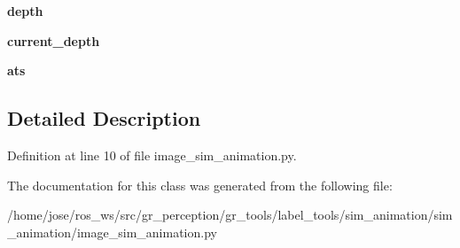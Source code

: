\begin{DoxyCompactItemize}
{\bfseries depth}
\item 
\mbox{\label{classsim__animation_1_1sim__animation_1_1image__sim__animation_1_1ImageSinAnimationLabeler_a6e5ab1bd4726b39c366f272e0c6dcfde}} 
{\bfseries current\+\_\+depth}
\item 
\mbox{\label{classsim__animation_1_1sim__animation_1_1image__sim__animation_1_1ImageSinAnimationLabeler_af0f9956ae5d0dfdb239fe17db8b69629}} 
{\bfseries ats}
\end{DoxyCompactItemize}


\subsection{Detailed Description}


Definition at line 10 of file image\+\_\+sim\+\_\+animation.\+py.



The documentation for this class was generated from the following file\+:\begin{DoxyCompactItemize}
\item 
/home/jose/ros\+\_\+ws/src/gr\+\_\+perception/gr\+\_\+tools/label\+\_\+tools/sim\+\_\+animation/sim\+\_\+animation/image\+\_\+sim\+\_\+animation.\+py\end{DoxyCompactItemize}
